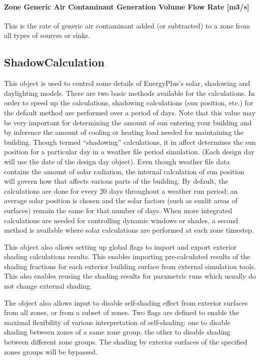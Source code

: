 \paragraph{Zone Generic Air Contaminant Generation Volume Flow Rate {[}m3/s{]}}\label{zone-generic-air-contaminant-generation-volume-flow-rate-m3s}

This is the rate of generic air contaminant added (or subtracted) to a zone from all types of sources or sinks.

\subsection{ShadowCalculation}\label{shadowcalculation}

This object is used to control some details of EnergyPlus's solar, shadowing and daylighting models. There are two basic methods available for the calculations. In order to speed up the calculations, shadowing calculations (sun position, etc.) for the default method are performed over a period of days. Note that this value may be very important for determining the amount of sun entering your building and by inference the amount of cooling or heating load needed for maintaining the building. Though termed ``shadowing'' calculations, it in affect determines the sun position for a particular day in a weather file period simulation. (Each design day will use the date of the design day object). Even though weather file data contains the amount of solar radiation, the internal calculation of sun position will govern how that affects various parts of the building. By default, the calculations are done for every 20 days throughout a weather run period; an average solar position is chosen and the solar factors (such as sunlit areas of surfaces) remain the same for that number of days. When more integrated calculations are needed for controlling dynamic windows or shades, a second method is available where solar calculations are performed at each zone timestep.

This object also allows setting up global flags to import and export exterior shading calculations results. This enables importing pre-calculated results of the shading fractions for each exterior building surface from external simulation tools. This also enables reusing the shading results for parametric runs which usually do not change external shading.

The object also allows input to disable self-shading effect from exterior surfaces from all zones, or from a subset of zones. Two flags are defined to enable the maximal flexibility of various interpretation of self-shading: one to disable shading between zones of a same zone group, the other to disable shading between different zone groups. The shading by exterior surfaces of the specified zones groups will be bypassed.

